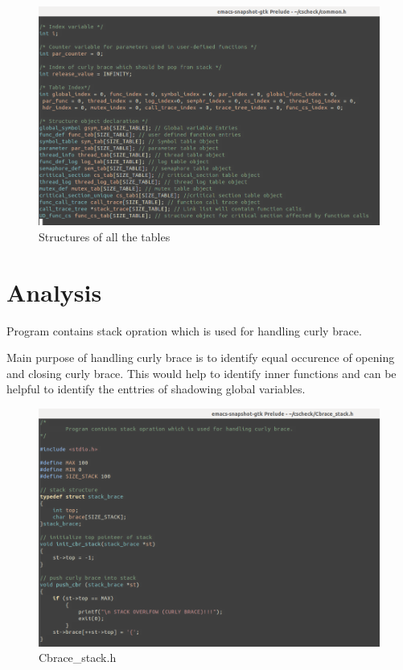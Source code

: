 \begin{figure}[H]
\centering
\includegraphics[scale=0.4]{Snaps/common_6.png}
\caption{Structures of all the tables}
\label{<<Label>>}
\end{figure}





\section{Analysis}
Program contains stack opration which is used for handling curly brace.

Main purpose of handling curly brace is to identify equal occurence of
opening and closing curly brace. This would help to identify inner functions
and can be helpful to identify the enttries of shadowing global variables.
\begin{figure}[H]
\centering
\includegraphics[scale=0.4]{Snaps/stacktrace_1.png}
\caption{Cbrace\_stack.h}
\label{<<Label>>}
\end{figure}

